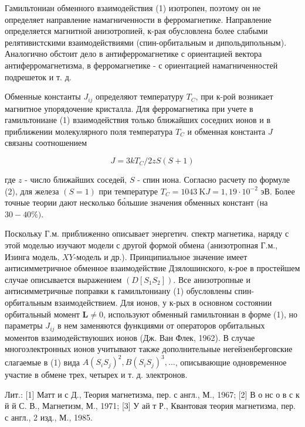 \documentclass[10pt]{article}
\begin{document}
Гамильтониан обменного взаимодействия (1) изотропен, поэтому он не определяет направление намагниченности в ферромагнетике. Направление определяется магнитной анизотропией, к-рая обусловлена более слабыми релятивистскими взаимодействиями (спин-орбитальным и дипольдипольным). Аналогично обстоит дело в антиферромагнетике с ориентацией вектора антиферромагнетизма, в ферромагнетике - с ориентацией намагниченностей подрешеток и т. д.



Обменные константы $J_{i j}$ определяют температуру $T_{C}$, при к-рой возникает магнитное упорядочение кристалла. Для ферромагнетика при учете в гамильтониане (1) взаимодействия только ближайших соседних ионов и в приближении молекулярного поля температура $T_{C}$ и обменная константа $J$ связаны соотношением



\[

J=3 k T_{C} / 2 z S(S+1)

\]



где $z$ - число ближайших соседей, $S$ - спин иона. Согласно расчету по формуле (2), для железа $(S=1)$ при температуре $T_{C}=1043 \mathrm{~K} J=1,19 \cdot 10^{-2}$ эВ. Более точные теории дают несколько бо́льшие значения обменных констант (на $30-40 \%)$.



Поскольку Г.м. приближенно описывает энергетич. спектр магнетика, наряду с этой моделью изучают модели с другой формой обмена (анизотропная Г.м., Изинга модель, $X Y$-модель и др.). Принципиальное значение имеет антисимметричное обменное взаимодействие Дзялошинского, к-рое в простейшем случае описывается выражением $\left(D\left[S_{1} S_{2}\right]\right)$. Все анизотропные и антисимметричные поправки к гамильтониану (1) обусловлены спин-орбитальным взаимодействием. Для ионов, у к-рых в основном состоянии орбитальный момент $\boldsymbol{L} \neq 0$, используют обменный гамильтониан в форме (1), но параметры $J_{i j}$ в нем заменяются функциями от операторов орбитальных моментов взаимодействуюших ионов (Дж. Ван Флек, 1962). В случае многоэлектронных ионов учитывают также дополнительные негейзенберговские слагаемые в (1) вида $A\left(S_{i} S_{j}\right)^{2}, B\left(S_{i} S_{j}\right)^{3}, \ldots$, описывающие одновременное участие в обмене трех, четырех и т. д. электронов.



Лит.: [1] Матт и с Д., Теория магнетизма, пер. с англ., М., 1967; [2] В о нс о в с к й й С. В., Магнетизм, М., 1971; [3] У ай т Р., Квантовая теория магнетизма, пер. с англ., 2 изд., М., 1985.
\end{document}
